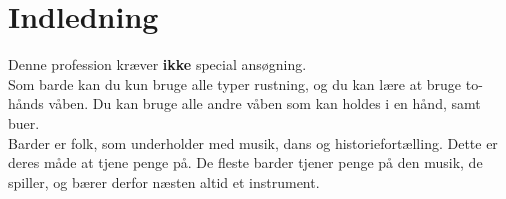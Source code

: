 
\chapter{Indledning}

Denne profession kræver \textbf{ikke} special ansøgning.\\
Som barde kan du kun bruge alle typer rustning, og du kan lære at bruge to-hånds våben. Du kan bruge alle andre våben som kan holdes i en hånd, samt buer.\\

Barder er folk, som underholder med musik, dans og historiefortælling. Dette er deres måde at tjene penge på. De fleste barder tjener penge på den musik, de spiller, og bærer derfor næsten altid et instrument.
